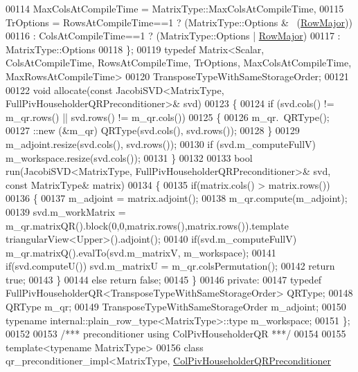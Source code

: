 \begin{DoxyCode}
00114     MaxColsAtCompileTime = MatrixType::MaxColsAtCompileTime,
00115     TrOptions = RowsAtCompileTime==1 ? (MatrixType::Options & ~(\hyperlink{group__enums_ggaacded1a18ae58b0f554751f6cdf9eb13acfcde9cd8677c5f7caf6bd603666aae3}{RowMajor}))
00116               : ColsAtCompileTime==1 ? (MatrixType::Options |   \hyperlink{group__enums_ggaacded1a18ae58b0f554751f6cdf9eb13acfcde9cd8677c5f7caf6bd603666aae3}{RowMajor})
00117               : MatrixType::Options
00118   \};
00119   \textcolor{keyword}{typedef} Matrix<Scalar, ColsAtCompileTime, RowsAtCompileTime, TrOptions, MaxColsAtCompileTime,
       MaxRowsAtCompileTime>
00120           TransposeTypeWithSameStorageOrder;
00121 
00122   \textcolor{keywordtype}{void} allocate(\textcolor{keyword}{const} JacobiSVD<MatrixType, FullPivHouseholderQRPreconditioner>& svd)
00123   \{
00124     \textcolor{keywordflow}{if} (svd.cols() != m\_qr.rows() || svd.rows() != m\_qr.cols())
00125     \{
00126       m\_qr.~QRType();
00127       ::new (&m\_qr) QRType(svd.cols(), svd.rows());
00128     \}
00129     m\_adjoint.resize(svd.cols(), svd.rows());
00130     \textcolor{keywordflow}{if} (svd.m\_computeFullV) m\_workspace.resize(svd.cols());
00131   \}
00132 
00133   \textcolor{keywordtype}{bool} run(JacobiSVD<MatrixType, FullPivHouseholderQRPreconditioner>& svd, \textcolor{keyword}{const} MatrixType& matrix)
00134   \{
00135     \textcolor{keywordflow}{if}(matrix.cols() > matrix.rows())
00136     \{
00137       m\_adjoint = matrix.adjoint();
00138       m\_qr.compute(m\_adjoint);
00139       svd.m\_workMatrix = m\_qr.matrixQR().block(0,0,matrix.rows(),matrix.rows()).\textcolor{keyword}{template} 
      triangularView<Upper>().adjoint();
00140       \textcolor{keywordflow}{if}(svd.m\_computeFullV) m\_qr.matrixQ().evalTo(svd.m\_matrixV, m\_workspace);
00141       \textcolor{keywordflow}{if}(svd.computeU()) svd.m\_matrixU = m\_qr.colsPermutation();
00142       \textcolor{keywordflow}{return} \textcolor{keyword}{true};
00143     \}
00144     \textcolor{keywordflow}{else} \textcolor{keywordflow}{return} \textcolor{keyword}{false};
00145   \}
00146 \textcolor{keyword}{private}:
00147   \textcolor{keyword}{typedef} FullPivHouseholderQR<TransposeTypeWithSameStorageOrder> QRType;
00148   QRType m\_qr;
00149   TransposeTypeWithSameStorageOrder m\_adjoint;
00150   \textcolor{keyword}{typename} internal::plain\_row\_type<MatrixType>::type m\_workspace;
00151 \};
00152 
00153 \textcolor{comment}{/*** preconditioner using ColPivHouseholderQR ***/}
00154 
00155 \textcolor{keyword}{template}<\textcolor{keyword}{typename} MatrixType>
00156 \textcolor{keyword}{class }qr\_preconditioner\_impl<MatrixType, \hyperlink{group__enums_gga46eba0d5c621f590b8cf1b53af31d56eaebc52a2365eec1df700ea97bd7af2d9a}{ColPivHouseholderQRPreconditioner}

\end{DoxyCode}
